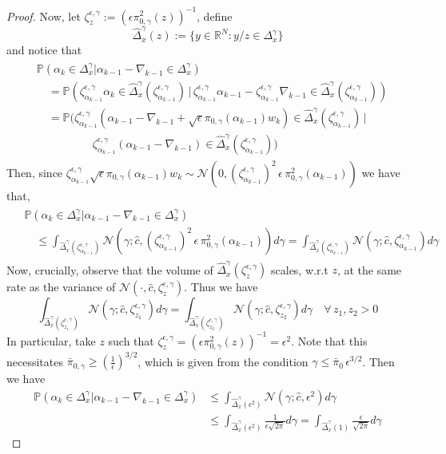 \documentclass[journal,onecolumn]{IEEEtran}
\newcommand{\alk}{\alpha_k}
\newcommand{\alkm}{\alpha_{k-1}}
\newcommand{\step}{\epsilon}
\newcommand{\grad}{\nabla}
\newcommand{\gaus}{\mathcal{N}}
\newcommand{\reals}{\mathbb{R}}
\newcommand{\PR}{\mathbb{P}}
\newcommand{\dimn}{N}
\newcommand{\ids}{\pi}
\newcommand{\idistmax}{\bar{\ids}_0}
\newcommand{\idw}{\gamma}
\newcommand{\isp}{0,\idw}
\newcommand{\idistmaxw}{\bar{\ids}_{\isp}}
\newcommand{\levxw}{\Delta_{x}^{\idw}}
\newcommand{\levxwp}{\hat{\Delta}_x^{\idw}}
\newcommand{\wtk}{\zeta_{\alpha_{k-1}}^{\step,\idw}}
\newcommand{\wtz}{\zeta_{z}^{\step,\idw}}
\newcommand{\idistrw}{\ids_{\isp}}
\begin{document}
{\begin{proof}
Now, let $\wtz := (\step \idistrw^2(z))^{-1}$, define \[\levxwp(z) := \{y\in \reals^{\dimn} : y/z \in \levxw \}\] and notice that 
\begin{align*}
    \begin{split}
        &\PR\left(\alk \in \levxw | \alkm - \grad_{k-1} \in \levxw\right) \\&\quad = \PR\left(\wtk\alk \in \levxwp(\wtk) \,| \,\wtk\alkm - \wtk\grad_{k-1} \in \levxwp(\wtk)\right) \\
        &\quad = \PR\biggl(\wtk(\alkm - \grad_{k-1} + \sqrt{\step} \idistrw(\alkm) w_k) \in \levxwp(\wtk) \, | \\&\quad \quad \quad \quad \quad  \wtk( \alkm - \grad_{k-1}) \in \levxwp(\wtk) \biggr)
    \end{split}
\end{align*}
 Then, since $\wtk \sqrt{\step} \idistrw(\alkm) w_k \sim \gaus(0,(\wtk)^2 \,\step \,\idistrw^2(\alkm))$ we have that,
 \begin{align*}
    \begin{split}
    \label{eq:ballint}
         &\PR\left(\alk \in \levxw | \alkm - \grad_{k-1} \in \levxw\right) \\&\quad \leq \int_{\levxwp(\wtk)}\gaus(\gamma; \hat{c},(\wtk)^2\, \step \,\idistrw^2(\alkm))d\gamma = \int_{\levxwp(\wtk)}\gaus(\gamma; \hat{c},\wtk)d\gamma
    \end{split}
 \end{align*}
 Now, crucially, observe that the volume of $\levxwp(\wtz)$ scales, w.r.t $z$, at the same rate as the variance of $\gaus(\cdot,\hat{c},\wtz)$. Thus we have \[\int_{\levxwp(\zeta^{\step,\idw}_{z_1})}\gaus(\gamma; \hat{c},\zeta^{\step,\idw}_{z_1} )d\gamma = \int_{\levxwp(\zeta^{\step,\idw}_{z_2})}\gaus(\gamma; \hat{c}, \zeta^{\step,\idw}_{z_2})d\gamma \quad \forall \, z_1,z_2 > 0\]
In particular, take $z$ such that $\wtz = (\step \idistrw^2(z))^{-1} = \step^2$. Note that this necessitates $\idistmaxw \geq (\frac{1}{\step})^{3/2}$, which is given from the condition $\idw \leq \idistmax\,\step^{3/2}$. Then we have 
\begin{align*}
    \PR\left(\alk \in \levxw | \alkm - \grad_{k-1} \in \levxw\right) &\leq \int_{\levxwp(\step^2)}\gaus(\gamma; \hat{c},\step^2)d\gamma \\&\leq \int_{\levxwp(\step^2)}\frac{1}{\step\sqrt{2\pi}}d\gamma = \int_{\levxwp(1)}\frac{\step}{\sqrt{2\pi}}d\gamma

\end{align*}
\end{proof}}
\end{document}
